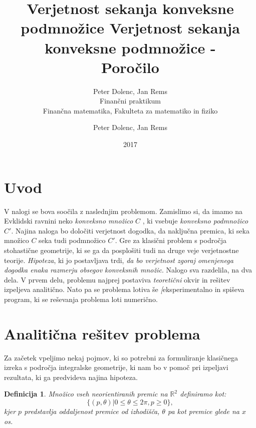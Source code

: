 \documentclass[a4paper]{article}
\title{Verjetnost sekanja konveksne podmnožice}
\author{Peter Dolenc, Jan Rems \\ Finančni praktikum \\ Finančna matematika, Fakulteta za matematiko in fiziko}
\date{2017}
\newtheorem{definicija}{Definicija}
\begin{document}
\title{%
  Verjetnost sekanja konveksne podmnožice -\\
   \large Poročilo \\}

\author{Peter Dolenc, Jan Rems}

\maketitle

\pagebreak

\section{Uvod}


V nalogi se bova soočila z naslednjim problemom. Zamislimo si, da imamo na Evklidski ravnini neko \textit{konveksno množico} $C$ , ki vsebuje \textit{konveksno podmnožico } $C'$. Najina naloga bo določiti verjetnost dogodka, da naključna premica, ki seka množico $C$ seka tudi podmnožico $C'$. Gre za klasični problem s področja stohastične geometrije, ki se ga da posplošiti tudi na druge veje verjetnostne teorije. \textit{Hipoteza}, ki jo postavljava trdi, \textit{da bo verjetnost zgoraj omenjenega dogodka enaka razmerju obsegov konveksnih množic}. Nalogo sva razdelila, na dva dela. V prvem delu, problemu najprej postaviva \textit{teoretični}  okvir in rešitev izpeljeva analitično. Nato pa se problema lotiva še \textit[{eksperimentalno} in spiševa program, ki se reševanja problema loti numerično.


\vspace{4 mm}


\section{Analitična rešitev problema}

Za začetek vpeljimo nekaj pojmov, ki so potrebni za formuliranje klasičnega izreka s področja integralske geometrije, ki nam bo v pomoč pri izpeljavi rezultata, ki ga predvideva najina hipoteza.

\begin{definicija}\label{def:1}
Množico vseh neorientiranih premic na $\mathbb{R}^2$ definiramo kot: $$ \{ (p,\theta)|0 \le \theta \le 2 \pi , p \ge 0\},$$ kjer $p$ predstavlja oddaljenost premice od izhodišča, $\theta$ pa kot premice glede na $x$ os.
\end{definicija}

\vspace{3 mm}
\end{document}
